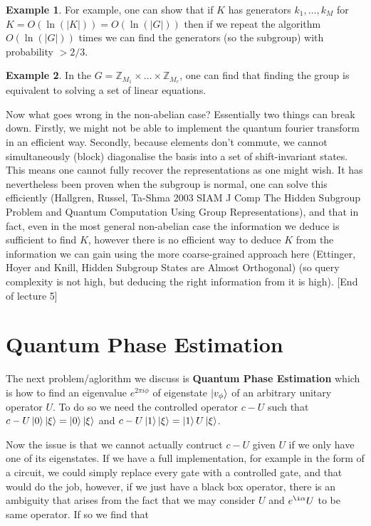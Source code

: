 \documentclass{article}
\theoremstyle{definition}
\newtheorem{example}{Example}
\begin{document}
\begin{example}
  For example, one can show that if $K$ has generators $k_1, \dots, k_M$ for $K
  = O(\ln(|K|)) = O(\ln(|G|))$ then if we repeat the algorithm $O(\ln(|G|))$
  times we can find the generators (so the subgroup) with probability $> 2/3$.
\end{example}

\begin{example}
  In the $G = \mathbb{Z}_{M_1} \times \dots \times \mathbb{Z}_{M_r}$, one can
  find that finding the group is equivalent to solving a set of linear
  equations.
\end{example}

Now what goes wrong in the non-abelian case? Essentially two things can break
down. Firstly, we might not be able to implement the quantum fourier transform
in an efficient way. Secondly, because elements don't commute, we cannot
simultaneously (block) diagonalise the basis into a set of shift-invariant
states. This means one cannot fully recover the representations as one might
wish. It has nevertheless been proven when the subgroup is normal, one can solve
this efficiently (Hallgren, Russel, Ta-Shma 2003 SIAM J Comp The Hidden Subgroup
Problem and Quantum Computation Using Group Representations), and that in fact,
even in the most general non-abelian case the information we deduce is
sufficient to find $K$, however there is no efficient way to deduce $K$ from the
information we can gain using the more coarse-grained approach here (Ettinger,
Hoyer and Knill, Hidden Subgroup States are Almost Orthogonal) (so query
complexity is not high, but deducing the right information from it is high).
[End of lecture 5]

\section{Quantum Phase Estimation}

The next problem/aglorithm we discuss is \textbf{Quantum Phase Estimation} which
is how to find an eigenvalue $e^{2\pi i \phi}$ of eigenstate $\ket{v_\phi}$ of
an arbitrary unitary operator $U$. To do so we need the controlled operator
$c-U$ such that $c-U \ket{0} \ket{\xi} = \ket{0}\ket{\xi}$ and $c-U \ket{1}
\ket{\xi} = \ket{1} U \ket{\xi}$.

Now the issue is that we cannot actually contruct $c-U$ given $U$ if we only
have one of its eigenstates. If we have a full implementation, for example in
the form of a circuit, we could simply replace every gate with a controlled
gate, and that would do the job, however, if we just have a black box operator,
there is an ambiguity that arises from the fact that we may consider $U$ and
$e^{\i\alpha} U$ to be same operator. If so we find that
\end{document}
